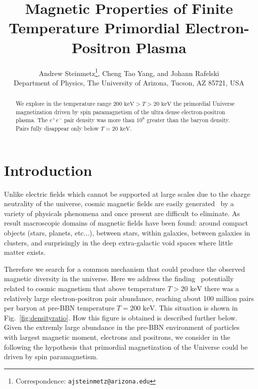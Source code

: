 \documentclass[a4paper]{article}
\title{\boldmath Magnetic Properties of Finite Temperature Primordial Electron-Positron Plasma}
\author{Andrew Steinmetz\orc{\orcC}\thanks{Correspondence: \texttt{ajsteinmetz@arizona.edu}}, Cheng Tao Yang\orc{\orcB}, and Johann Rafelski\orc{\orcA}\\ Department of Physics, The University of Arizona, Tucson, AZ 85721, USA}
\newcommand*{\keV}{\text{ keV}}
\newcommand{\rf}[1]{Fig.~{\ref{#1}}}
\begin{document}
\maketitle

\begin{abstract}
    We explore in the temperature range $200\keV>T>20\keV$ the primordial Universe magnetization driven by spin paramagnetism  of the ultra dense electron-positron plasma. The $e^{+}e^{-}$ pair density was more than $10^{8}$ greater than the baryon density. Pairs fully disappear only below $T=20\keV$. 
    
\end{abstract}


\section{Introduction}
\label{sec:introduction}
\noindent  
Unlike electric fields which cannot be supported at large scales due to the charge neutrality of the universe, cosmic magnetic fields are easily generated~\cite{giovannini2003magnetized,kronberg1994extragalactic} by a variety of physicals phenomena and once present are difficult to eliminate. As result macroscopic domains of magnetic fields have been found: around compact objects (stars, planets, etc...), between stars, within galaxies, between galaxies in clusters, and surprisingly in the deep extra-galactic void spaces where little matter exists. 

Therefore we search for a common mechanism that could produce the observed magnetic diversity in the universe.  Here we address the finding~\cite{rafelski2023short} potentially related to cosmic magnetism that above temperature $T>20\keV$ there was a relatively large electron-positron pair abundance, reaching about 100 million pairs per baryon at pre-BBN temperature $T=200\keV$. This situation is shown in \rf{fig:densityratio}. How this figure is obtained is described  further below. Given the extremly large abundance in the pre-BBN environment of particles with largest magnetic moment, electrons and positrons,  we consider in the following the hypothesis that primordial magnetization of the Universe could be driven by spin paramagnetism.
\end{document}
